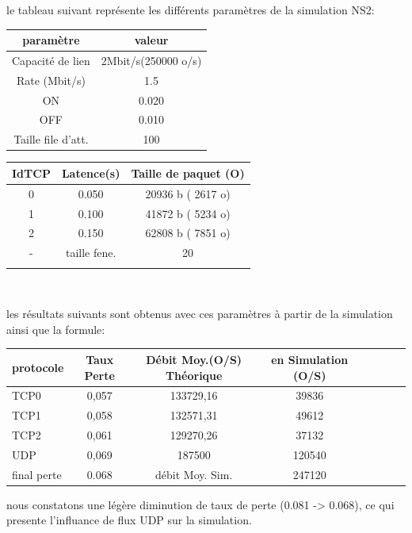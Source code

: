 \documentclass[a4paper]{report}
\theoremstyle{definition}
\begin{document}
	le tableau suivant représente les différents paramètres de la simulation NS2:
\begin{center}


\begin{tabular}{|c|c|}
\hline
 paramètre  & valeur \\ \hline
 
 Capacité de lien & 2Mbit/s(250000 o/s) \\ 
 Rate (Mbit/s) & 1.5 \\ 
 ON & 0.020  \\ 
 OFF & 0.010 \\ 
 Taille file d'att. & 100\\
\hline
\end{tabular}
\begin{tabular}{|c|c|c|}
\hline
 IdTCP  & Latence(s) & Taille de paquet (O) \\ \hline
 
 0 & 0.050 & 20936 b ( 2617 o)	 \\ 
 1 & 0.100 & 41872 b ( 5234 o)	 \\ 
 2 & 0.150 & 62808 b ( 7851 o)	 \\ 
 - & taille fene. & 20\\ 
&&\\ 
\hline
\end{tabular}\\
\end{center}

les résultats suivants sont obtenus avec ces paramètres à partir de la simulation ainsi que la formule: \\

\begin{tabular}{|l|c|c|c|c|c|c|c|}
\hline
 protocole & Taux Perte & Débit Moy.(O/S) Théorique & en Simulation (O/S) \\ \hline
 TCP0 & 0,057 &  133729,16 &  39836     \\
 TCP1 & 0,058 &  132571,31 &  49612     \\ 
 TCP2 & 0,061 &  129270,26 &  37132     \\ 
 UDP  & 0,069 &  187500     &  120540 \\ 
 \hline
 final perte & 0.068  & débit Moy. Sim. & 247120   \\ 
\hline
\end{tabular}

nous constatons une légère diminution de taux de perte (0.081 -> 0.068), ce qui presente l'influance de flux UDP sur la simulation.
\end{document}
